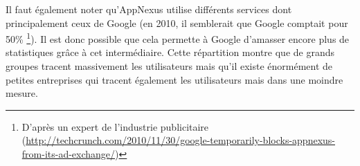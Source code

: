 Il faut également noter qu'AppNexus utilise différents services dont principalement ceux de Google (en 2010, il semblerait que Google comptait pour 50\% \footnote{D'après un expert de l'industrie publicitaire (\url{http://techcrunch.com/2010/11/30/google-temporarily-blocks-appnexus-from-its-ad-exchange/})}). Il est donc possible que cela permette à Google d'amasser encore plus de statistiques grâce à cet intermédiaire. Cette répartition montre que de grands groupes tracent massivement les utilisateurs mais qu'il existe énormément de petites entreprises qui tracent également les utilisateurs mais dans une moindre mesure. 
